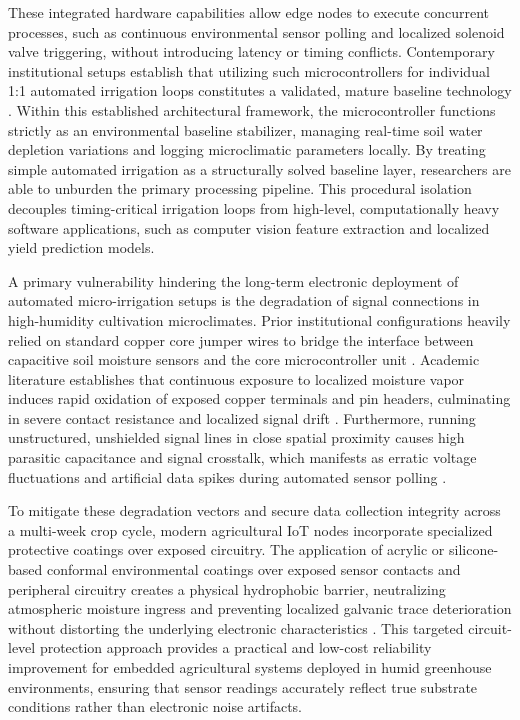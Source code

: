 These integrated hardware capabilities allow edge nodes to execute concurrent processes, such as continuous environmental sensor polling and localized solenoid valve triggering, without introducing latency or timing conflicts. Contemporary institutional setups establish that utilizing such microcontrollers for individual 1:1 automated irrigation loops constitutes a validated, mature baseline technology \cite{Kushwaha2024, ZamoraOgue2025}. Within this established architectural framework, the microcontroller functions strictly as an environmental baseline stabilizer, managing real-time soil water depletion variations and logging microclimatic parameters locally. By treating simple automated irrigation as a structurally solved baseline layer, researchers are able to unburden the primary processing pipeline. This procedural isolation decouples timing-critical irrigation loops from high-level, computationally heavy software applications, such as computer vision feature extraction and localized yield prediction models.

A primary vulnerability hindering the long-term electronic deployment of automated micro-irrigation setups is the degradation of signal connections in high-humidity cultivation microclimates. Prior institutional configurations heavily relied on standard copper core jumper wires to bridge the interface between capacitive soil moisture sensors and the core microcontroller unit \cite{ZamoraOgue2025}. Academic literature establishes that continuous exposure to localized moisture vapor induces rapid oxidation of exposed copper terminals and pin headers, culminating in severe contact resistance and localized signal drift \cite{Sheng2019}. Furthermore, running unstructured, unshielded signal lines in close spatial proximity causes high parasitic capacitance and signal crosstalk, which manifests as erratic voltage fluctuations and artificial data spikes during automated sensor polling \cite{Younis2021}.

To mitigate these degradation vectors and secure data collection integrity across a multi-week crop cycle, modern agricultural IoT nodes incorporate specialized protective coatings over exposed circuitry. The application of acrylic or silicone-based conformal environmental coatings over exposed sensor contacts and peripheral circuitry creates a physical hydrophobic barrier, neutralizing atmospheric moisture ingress and preventing localized galvanic trace deterioration without distorting the underlying electronic characteristics \cite{Sheng2019}. This targeted circuit-level protection approach provides a practical and low-cost reliability improvement for embedded agricultural systems deployed in humid greenhouse environments, ensuring that sensor readings accurately reflect true substrate conditions rather than electronic noise artifacts.

